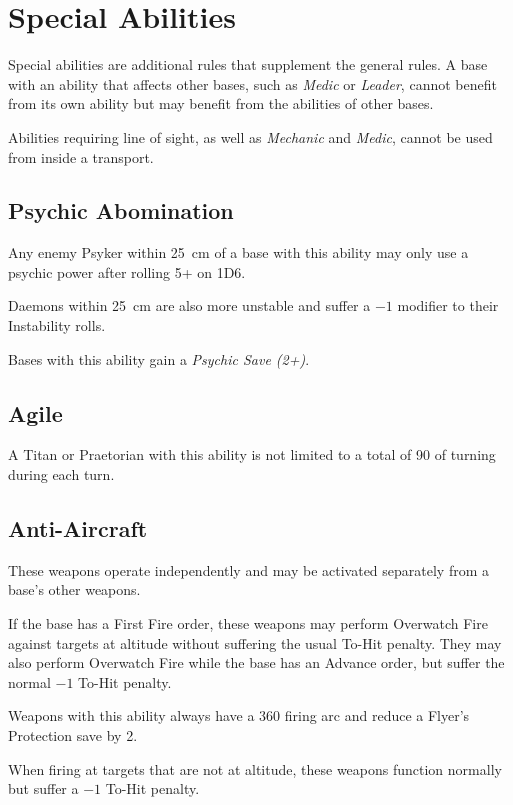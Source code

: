 \section{Special Abilities}
Special abilities are additional rules that supplement the general rules. A base with an ability that affects other bases, such as \textit{Medic} or \textit{Leader}, cannot benefit from its own ability but may benefit from the abilities of other bases.

Abilities requiring line of sight, as well as \textit{Mechanic} and \textit{Medic}, cannot be used from inside a transport.

\subsection{Psychic Abomination}

Any enemy Psyker within 25~cm of a base with this ability may only use a psychic power after rolling 5+ on 1D6.

Daemons within 25~cm are also more unstable and suffer a $-1$ modifier to their Instability rolls.

Bases with this ability gain a \textit{Psychic Save (2+)}.

\subsection{Agile}

A Titan or Praetorian with this ability is not limited to a total of 90\textdegree{} of turning during each turn.

\subsection{Anti-Aircraft}

These weapons operate independently and may be activated separately from a base's other weapons.

If the base has a First Fire order, these weapons may perform Overwatch Fire against targets at altitude without suffering the usual To-Hit penalty. They may also perform Overwatch Fire while the base has an Advance order, but suffer the normal $-1$ To-Hit penalty.

Weapons with this ability always have a 360\textdegree{} firing arc and reduce a Flyer's Protection save by 2.

When firing at targets that are not at altitude, these weapons function normally but suffer a $-1$ To-Hit penalty.

